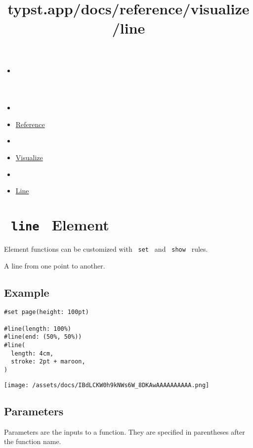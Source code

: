 \title{typst.app/docs/reference/visualize/line}

\begin{itemize}
\tightlist
\item
  \href{/docs}{}
\item
  
\item
  \href{/docs/reference/}{Reference}
\item
  
\item
  \href{/docs/reference/visualize/}{Visualize}
\item
  
\item
  \href{/docs/reference/visualize/line/}{Line}
\end{itemize}

\section{\texorpdfstring{\texttt{\ line\ } {{ Element
}}}{ line   Element }}\label{summary}

\label{element-tooltip}
Element functions can be customized with \texttt{\ set\ } and
\texttt{\ show\ } rules.

A line from one point to another.

\subsection{Example}\label{example}

\begin{verbatim}
#set page(height: 100pt)

#line(length: 100%)
#line(end: (50%, 50%))
#line(
  length: 4cm,
  stroke: 2pt + maroon,
)
\end{verbatim}

\texttt{[image: /assets/docs/IBdLCKW0h9kNWs6W\_8DKAwAAAAAAAAAA.png]}

\subsection{\texorpdfstring{{ Parameters
}}{ Parameters }}\label{parameters}

\label{parameters-tooltip}
Parameters are the inputs to a function. They are specified in
parentheses after the function name.

